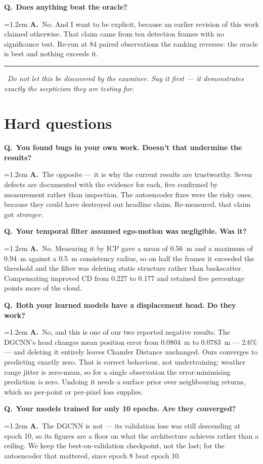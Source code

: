 \documentclass[11pt,a4paper]{article}
\newcommand{\Q}[1]{\medskip\noindent\textcolor{qcol}{\textbf{Q.}}\ \textbf{#1}\par\nopagebreak}
\newcommand{\A}[1]{\noindent\hangindent=1.2em\hangafter=0 \textcolor{inkcol}{\textbf{A.}}\ #1\par}
\newcommand{\danger}[1]{\medskip\noindent\textcolor{warncol}{\rule{2.5pt}{9pt}}\ \textit{\textcolor{warncol}{#1}}\par}
\begin{document}
\Q{Does anything beat the oracle?}
\A{No. And I want to be explicit, because an earlier revision of this work
claimed otherwise. That claim came from ten detection frames with no
significance test. Re-run at 84 paired observations the ranking reverses:
the oracle is best and nothing exceeds it.}

\danger{Do not let this be discovered by the examiner. Say it first --- it
demonstrates exactly the scepticism they are testing for.}

\section{Hard questions}

\Q{You found bugs in your own work. Doesn't that undermine the results?}
\A{The opposite --- it is why the current results are trustworthy. Seven
defects are documented with the evidence for each, five confirmed by
measurement rather than inspection. The autoencoder fixes were the risky
ones, because they could have destroyed our headline claim. Re-measured, that
claim got \emph{stronger}.}

\Q{Your temporal filter assumed ego-motion was negligible. Was it?}
\A{No. Measuring it by ICP gave a mean of 0.56~m and a maximum of 0.94~m
against a 0.5~m consistency radius, so on half the frames it exceeded the
threshold and the filter was deleting static structure rather than
backscatter. Compensating improved CD from 0.227 to 0.177 and retained five
percentage points more of the cloud.}

\Q{Both your learned models have a displacement head. Do they work?}
\A{No, and this is one of our two reported negative results. The DGCNN's head
changes mean position error from 0.0804~m to 0.0783~m --- 2.6\% --- and
deleting it entirely leaves Chamfer Distance unchanged. Ours converges to
predicting exactly zero. That is correct behaviour, not undertraining:
weather range jitter is zero-mean, so for a single observation the
error-minimising prediction \emph{is} zero. Undoing it needs a surface prior
over neighbouring returns, which no per-point or per-pixel loss supplies.}

\Q{Your models trained for only 10 epochs. Are they converged?}
\A{The DGCNN is not --- its validation loss was still descending at epoch 10,
so its figures are a floor on what the architecture achieves rather than a
ceiling. We keep the best-on-validation checkpoint, not the last; for the
autoencoder that mattered, since epoch 8 beat epoch 10.}
\end{document}
